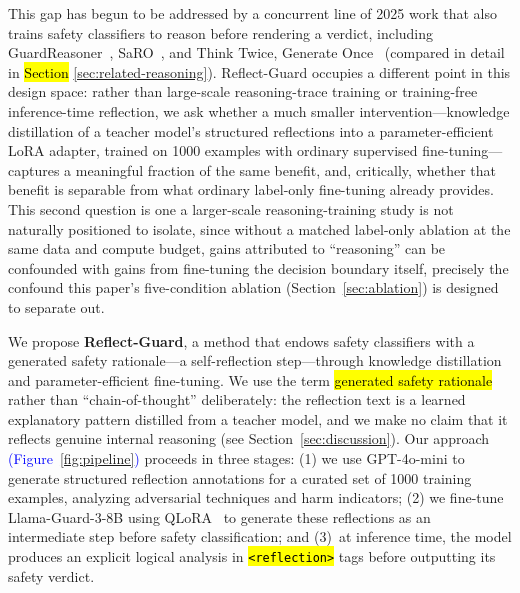 \documentclass[superintelligence,article,accept,moreauthors]{Definitions/mdpi}
\newcommand{\authchg}[1]{\textcolor{blue}{#1}}
\begin{document}
This gap has begun to be addressed by a concurrent line of 2025 work that also trains safety classifiers to reason before rendering a verdict, including GuardReasoner~\citep{liu2025guardreasoner}, SaRO~\citep{mou2025saro}, and Think Twice, Generate Once~\citep{phan2025thinktwice} (compared in detail in \hl{Section} %
 \ref{sec:related-reasoning}). Reflect-Guard occupies a different point in this design space: rather than large-scale reasoning-trace training or training-free inference-time reflection, we ask whether a much smaller intervention---knowledge distillation of a teacher model's structured reflections into a parameter-efficient LoRA adapter, trained on 1000 examples with ordinary supervised fine-tuning---captures a meaningful fraction of the same benefit, and, critically, whether that benefit is separable from what ordinary label-only fine-tuning already provides. This second question is one a larger-scale reasoning-training study is not naturally positioned to isolate, since without a matched label-only ablation at the same data and compute budget, gains attributed to ``reasoning'' can be confounded with gains from fine-tuning the decision boundary itself, precisely the confound this paper's five-condition ablation (Section~\ref{sec:ablation}) is designed to separate out.

We propose \textbf{Reflect-Guard}, a method that endows safety classifiers with a generated safety rationale---a self-reflection step---through knowledge distillation and parameter-efficient fine-tuning. We use the term \hl{generated safety rationale} %
 rather than ``chain-of-thought'' deliberately: the reflection text is a learned explanatory pattern distilled from a teacher model, and we make no claim that it reflects genuine internal reasoning (see Section~\ref{sec:discussion}). Our approach \authchg{(Figure~\ref{fig:pipeline})} proceeds in three stages: (1) we use GPT-4o-mini to generate structured reflection annotations for a curated set of 1000 training examples, analyzing adversarial techniques and harm indicators; (2) we fine-tune Llama-Guard-3-8B using QLoRA~\citep{dettmers2024qlora} to generate these reflections as an intermediate step before safety classification; and (3)~at inference time, the model produces an explicit logical analysis in \hl{\texttt{<reflection>} %
} tags before outputting its safety verdict.
\end{document}
